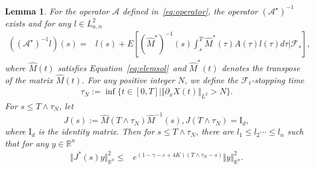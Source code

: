 \documentclass[11pt]{article}
\numberwithin{equation}{section}%
\numberwithin{figure}{section}%
\newtheorem{lemma}[theorem]{Lemma}
\theoremstyle{remark}
\begin{document}
	\begin{lemma}\label{lem:opera}
		 For the operator $\mathcal{A}$ defined in~\eqref{eq:operator}, the operator $	(\mathcal{A}^{\star})^{-1}$ exists and for any $l\in L_{a,n}^{2}$	
		\begin{align}\label{eq:inveroperator}
			((\mathcal{A}^{\star})^{-1}l)(s)=&l(s)+E\left[(\hat{M}^{*})^{-1}(s)\int_{s}^{T}\hat{M}^{*}(\tau)A(\tau)l(\tau)d\tau|\mathcal{F}_{s}\right],
		\end{align}
		where $\hat{M}(t)$ satisfies Equation~\eqref{eq:elemsol}~and $\hat{M}^{*}(t)$ denotes the transpose of the matrix $\hat{M}(t)$. For any positive integer $N$, we define the $\mathcal{F}_{t}$-stopping time
		\begin{align*}
			\tau_{N}:=\inf\{t\in[0,T]\mid\Vert \partial_{x}X(t)\Vert_{L^{2}}> N \}.
		\end{align*}
		For $s\leq T\wedge\tau_{N}$, let 
		$$J(s):=\hat{M}(T\wedge\tau_{N})\hat{M}^{-1}(s),J(T\wedge\tau_{N})=\text{I}_{d},$$
		where $\text{I}_{d}$ is the identity matrix. Then for $s\leq T\wedge\tau_{N}$, there are  $l_{1}\leq l_{2}\cdots\leq l_{n}$ such that for any $y\in\mathbb{R}^{n}$
		\begin{align}\label{eq:opestimat}
			\Vert J^{*}(s)y\Vert^{2}_{\mathbb{R}^{n}}\leq&e^{(1-\gamma-\varepsilon+4K)(T\wedge\tau_{N}-s)}\Vert y\Vert^{2}_{\mathbb{R}^{n}}.
		\end{align}
	\end{lemma}
\end{document}
